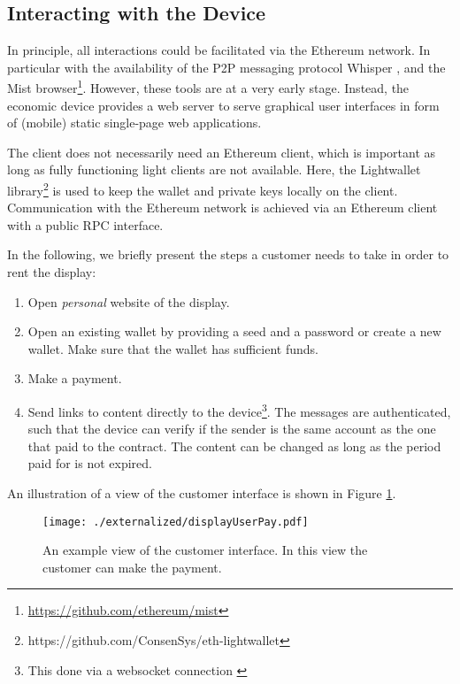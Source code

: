 \subsection{Interacting with the Device}

In principle, all interactions could be facilitated via the Ethereum network. In particular with the availability of the \ac{P2P} messaging protocol Whisper \parencite{whisper}, and the Mist browser\footnote{\url{https://github.com/ethereum/mist}}. However, these tools are at a very early stage. Instead, the economic device provides a web server to serve graphical user interfaces in form of (mobile) static single-page web applications. 

The client does not necessarily need an Ethereum client, which is important as long as fully functioning light clients are not available. Here, the Lightwallet library\footnote{https://github.com/ConsenSys/eth-lightwallet} is used to keep the wallet and private keys locally on the client. Communication with the Ethereum network is achieved via an Ethereum client with a public \ac{RPC} interface.

In the following, we briefly present the steps a customer needs to take in order to rent the display: 

\begin{enumerate}
\item Open \emph{personal} website of the display.
\item Open an existing wallet by providing a seed and a password or create a new wallet. Make sure that the wallet has sufficient funds.
\item Make a payment.
\item Send links to content directly to the device\footnote{This done via a websocket connection \parencite{rfc6455} }. The messages are authenticated, such that the device can verify if the sender is the same account as the one that paid to the contract. The content can be changed as long as the period paid for is not expired.
\end{enumerate} 

An illustration of a view of the customer interface is shown in Figure \ref{fig:payview}.

\begin{figure}
 \centering
 \texttt{[image: ./externalized/displayUserPay.pdf]}
 \caption{An example view of the customer interface. In this view the customer can make the payment.}
 \label{fig:payview}
 \end{figure}
 

